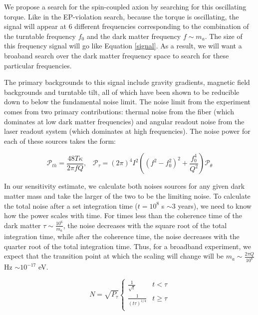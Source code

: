 \documentclass[aps,prd,final,letterpaper]{revtex4}
\begin{document}
We propose a search for the spin-coupled axion by searching for this oscillating torque. Like in the EP-violation search, because the torque is oscillating, the signal will appear at 6 different frequencies corresponding to the combination of the turntable frequency $f_0$ and the dark matter frequency $f \sim m_a$. The size of this frequency signal will go like Equation \ref{signal}. As a result, we will want a broaband search over the dark matter frequency space to search for these particular frequencies. 

The primary backgrounds to this signal include gravity gradients, magnetic field backgrounds and turntable tilt, all of which have been shown to be reducible down to below the fundamental noise limit. The noise limit from the experiment comes from two primary contributions: thermal noise from the fiber (which dominates at low dark matter frequencies) and angular readout noise from the laser readout system (which dominates at high frequencies). The noise power for each of these sources takes the form:

\begin{equation}
\mathcal{P}_{th} = \frac{48 T \kappa}{2\pi f Q}, \;\;\; \mathcal{P}_{\tau} = (2\pi)^4I^2\left((f^2 - f_0^2)^2 + \frac{f_0^4}{Q^2}\right)\mathcal{P}_{\theta}
\end{equation}


In our sensitivity estimate, we calculate both noises sources for any given dark matter mass and take the larger of the two to be the limiting noise. To calculate the total noise after a set integration time ($t = 10^8$ s $\sim 3$ years), we need to know how the power scales with time. For times less than the coherence time of the dark matter $\tau \sim \frac{10^6}{m_a}$, the noise decreases with the square root of the total integration time, while after the coherence time, the noise decreases with the quarter root of the total integration time. Thus, for a broadband experiment, we expect that the transition point at which the scaling will change will be $m_a \sim \frac{2\pi Q}{10^8}$Hz $\sim 10^{-17}$ eV.

\begin{equation}
N = \sqrt{P_{\tau}}
\begin{cases} 
      \frac{1}{\sqrt{t}} & t < \tau \\
      \frac{1}{(t\tau)^{1/4}} & t \geq  \tau\\
\end{cases}
\end{equation}
\end{document}
